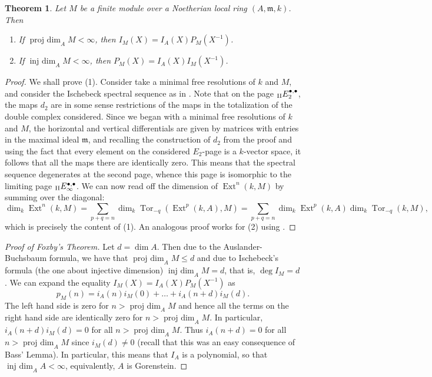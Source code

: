 \documentclass[11pt]{article}
\theoremstyle{thmstyle}
\newtheorem{theorem}{Theorem}
\theoremstyle{defstyle}
\newcommand{\Tor}{\operatorname{Tor}}
\newcommand{\frakm}{\mathfrak{m}} %
\renewcommand{\le}{\leqslant}
\newcommand{\Ext}{\operatorname{Ext}}
\newcommand{\projdim}{\operatorname{proj~dim}}
\newcommand{\injdim}{\operatorname{inj~dim}}
\begin{document}
\begin{theorem}
    Let $M$ be a finite module over a Noetherian local ring $(A,\frakm, k)$. Then 
    \begin{enumerate}[label=(\arabic*)]
        \item If $\projdim_A M < \infty$, then $I_M(X) = I_A(X)P_M(X^{-1})$.
        \item If $\injdim_A M < \infty$, then $P_M(X) = I_A(X) I_M(X^{-1})$.
    \end{enumerate}
\end{theorem}
\begin{proof}
    We shall prove (1). Consider take a minimal free resolutions of $k$ and $M$, and consider the Ischebeck spectral sequence as in . Note that on the page ${}_{\rm II}E_2^{\bullet,\bullet}$, the maps $d_2$ are in some sense restrictions of the maps in the totalization of the double complex considered. Since we began with a minimal free resolutions of $k$ and $M$, the horizontal and vertical differentials are given by matrices with entries in the maximal ideal $\frakm$, and recalling the construction of $d_2$ from the proof  and using the fact that every element on the considered $E_2$-page is a $k$-vector space, it follows that all the maps there are identically zero. This means that the spectral sequence degenerates at the second page, whence this page is isomorphic to the limiting page ${}_{\rm II}E_\infty^{\bullet, \bullet}$. We can now read off the dimension of $\Ext^n(k, M)$ by summing over the diagonal: 
    \begin{equation*}
        \dim_k\Ext^n(k, M) = \sum_{p + q = n}\dim_k\Tor_{-q}\left(\Ext^p(k, A), M\right) = \sum_{p + q = n}\dim_k\Ext^p(k, A)\dim_k\Tor_{-q}(k, M),
    \end{equation*}
    which is precisely the content of (1). An analogous proof works for (2) using .
\end{proof}

\begin{proof}[Proof of Foxby's Theorem]
    Let $d = \dim A$. Then due to the Auslander-Buchsbaum formula, we have that $\projdim_A M\le d$ and due to Ischebeck's formula (the one about injective dimension) $\injdim_A M = d$, that is, $\deg I_M = d$. We can expand the equality $I_M(X) = I_A(X) P_M(X^{-1})$ as 
    \begin{equation*}
        p_M(n) = i_A(n)i_M(0) + \dots + i_A(n + d)i_M(d).
    \end{equation*}
    The left hand side is zero for $n > \projdim_A M$ and hence all the terms on the right hand side are identically zero for $n > \projdim_A M$. In particular, $i_A(n + d)i_M(d) = 0$ for all $n > \projdim_A M$. Thus $i_A(n + d) = 0$ for all $n > \projdim_A M$ since $i_M(d)\ne 0$ (recall that this was an easy consequence of Bass' Lemma). In particular, this means that $I_A$ is a polynomial, so that $\injdim_A A < \infty$, equivalently, $A$ is Gorenstein.
\end{proof}



\end{document}
